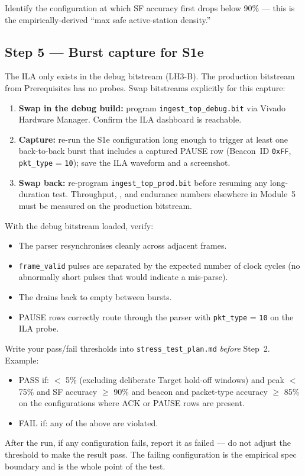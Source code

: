 \documentclass[11pt,letterpaper]{article}
\begin{document}
Identify the configuration at which SF accuracy first drops below 90\% --- this is the empirically-derived ``max safe active-station density.''

\subsection{Step 5 --- Burst capture for S1e}
The \mbox{ILA{}} only exists in the debug bitstream (LH3-B). The production bitstream from Prerequisites has no probes. Swap bitstreams explicitly for this capture:
\begin{enumerate}[leftmargin=2em]
	\item \textbf{Swap in the debug build:} program \texttt{ingest\_top\_debug.bit} via Vivado Hardware Manager. Confirm the \mbox{ILA{}} dashboard is reachable.
	\item \textbf{Capture:} re-run the S1e configuration long enough to trigger at least one back-to-back burst that includes a captured PAUSE row (Beacon~ID \texttt{0xFF}, \texttt{pkt\_type} = \texttt{10}); save the \mbox{ILA{}} waveform and a screenshot.
	\item \textbf{Swap back:} re-program \texttt{ingest\_top\_prod.bit} before resuming any long-duration test. Throughput, \PER{}, and endurance numbers elsewhere in Module~5 must be measured on the production bitstream.
\end{enumerate}

With the debug bitstream loaded, verify:
\begin{itemize}[leftmargin=2em]
	\item The parser resynchronises cleanly across adjacent frames.
	\item \texttt{frame\_valid} pulses are separated by the expected number of clock cycles (no abnormally short pulses that would indicate a mis-parse).
	\item The \FIFO{} drains back to empty between bursts.
	\item PAUSE rows correctly route through the parser with \texttt{pkt\_type} = \texttt{10} on the ILA probe.
\end{itemize}

\begin{tcolorbox}[warning={Pre-Declared Thresholds}]
	Write your pass/fail thresholds into \texttt{stress\_test\_plan.md} \emph{before} Step~2. Example:
	\begin{itemize}[leftmargin=1.2em]
		\item PASS if: \PER{} $<$ 5\% (excluding deliberate Target hold-off windows) and \FIFO{} peak $<$ 75\% and SF accuracy $\geq$ 90\% and beacon and packet-type accuracy $\geq$ 85\% on the configurations where ACK or PAUSE rows are present.
		\item FAIL if: any of the above are violated.
	\end{itemize}
	After the run, if any configuration fails, report it as failed --- do not adjust the threshold to make the result pass. The failing configuration is the empirical spec boundary and is the whole point of the test.
\end{tcolorbox}
\end{document}
